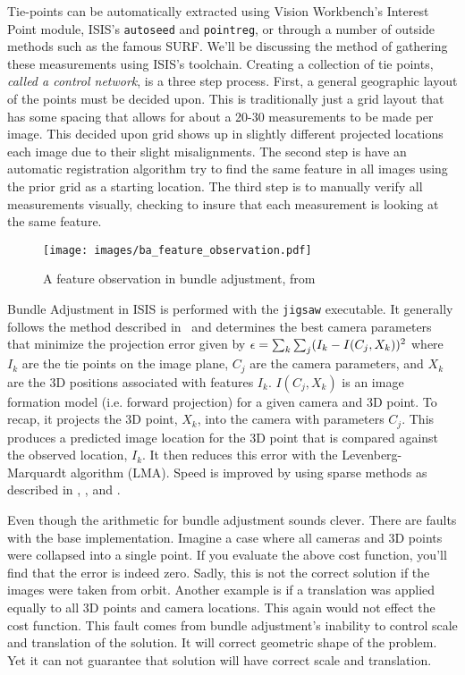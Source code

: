 Tie-points can be automatically extracted using Vision Workbench's
Interest Point module, \ac{ISIS}'s \texttt{autoseed} and \texttt{pointreg},
or through a number of outside methods such as the famous
SURF\citep{surf08}. We'll be discussing the method of gathering these
measurements using \ac{ISIS}'s toolchain. Creating a collection of tie
points, {\it called a control network}, is a three step process. First, a
general geographic layout of the points must be decided upon. This is
traditionally just a grid layout that has some spacing that allows for
about a 20-30 measurements to be made per image. This decided upon grid
shows up in slightly different projected locations each image due to
their slight misalignments. The second step is have an automatic
registration algorithm try to find the same feature in all images using
the prior grid as a starting location. The third step is to manually
verify all measurements visually, checking to insure that each
measurement is looking at the same feature.

\begin{figure}[b!]
  \begin{center}
  \texttt{[image: images/ba\_feature\_observation.pdf]}
  \end{center}
  \caption{ A feature observation in bundle adjustment, from \citet{moore09} }
  \label{fig:ba_feature}
\end{figure}

Bundle Adjustment in \ac{ISIS} is performed with the \texttt{jigsaw}
executable. It generally follows the method described
in~\cite{triggs00} and determines the best camera parameters that
minimize the projection error given by ${\bf \epsilon} =
\sum_k\sum_j(I_k-I(C_j, X_k))^2$ where $I_k$ are the tie points on the
image plane, $C_j$ are the camera parameters, and $X_k$ are the 3D
positions associated with features $I_k$. $I(C_j, X_k)$ is an image
formation model (i.e. forward projection) for a given camera and 3D
point. To recap, it projects the 3D point, $X_k$, into the camera with
parameters $C_j$. This produces a predicted image location for the 3D
point that is compared against the observed location, $I_k$. It then
reduces this error with the Levenberg-Marquardt algorithm (LMA). Speed
is improved by using sparse methods as described in \citet{hartley04},
\citet{konolige:sparsesparse}, and \citet{cholmod}.

Even though the arithmetic for bundle adjustment sounds clever. There
are faults with the base implementation. Imagine a case where all
cameras and 3D points were collapsed into a single point. If you
evaluate the above cost function, you'll find that the error is indeed
zero. Sadly, this is not the correct solution if the images were taken
from orbit. Another example is if a translation was applied equally to
all 3D points and camera locations. This again would not effect the
cost function. This fault comes from bundle adjustment's inability to
control scale and translation of the solution. It will correct
geometric shape of the problem. Yet it can not guarantee that solution
will have correct scale and translation.

